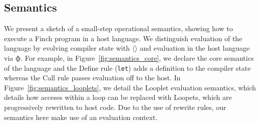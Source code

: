 



\subsection{Semantics}

We present a sketch of a small-step operational semantics, showing how to execute a Finch program in a host language.
%
We distinguish evaluation of the language by evolving compiler state with $\langle \rangle$ and evaluation in the host language via $\llangle\rrangle$.
%
For example, in Figure~\ref{fig:semantics_core}, we declare the core semantics of the language and the Define rule (\texttt{let}) adds a definition to the compiler state whereas the Call rule passes evaluation off to the host.
%
In Figure~\ref{fig:semantics_looplets}, we detail the Looplet evaluation semantics, which details how acceses within a loop can be replaced with Loopets, which are progressively rewritten to host code.
%
Due to the use of rewrite rules, our semantics here make use of an evaluation context.


